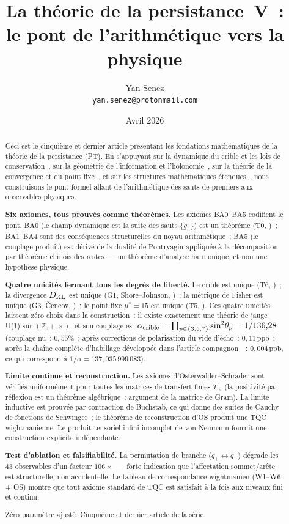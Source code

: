 \documentclass[12pt,a4paper]{article}
\title{\textbf{La théorie de la persistance~V~:\\
le pont de l'arithmétique vers la physique}}
\author{Yan Senez\\\texttt{yan.senez@protonmail.com}}
\date{Avril 2026}
\begin{document}
\maketitle

\begin{abstract}
Ceci est le cinquième et dernier article présentant les fondations
mathématiques de la théorie de la persistance (PT). En s'appuyant
sur la dynamique du crible et les lois de
conservation~\cite{companion_M1}, sur la géométrie de l'information
et l'holonomie~\cite{companion_M2}, sur la théorie de la convergence
et du point fixe~\cite{companion_M3}, et sur les structures
mathématiques étendues~\cite{companion_M4}, nous construisons le pont
formel allant de l'arithmétique des sauts de premiers aux observables
physiques.

\textbf{Six axiomes, tous prouvés comme théorèmes.}
Les axiomes BA0--BA5 codifient le pont. BA0 (le champ dynamique est
la suite des sauts $\{g_n\}$) est un théorème (T0,
\cite{companion_M3})~; BA1--BA4 sont des conséquences structurelles
du noyau arithmétique~; BA5 (le couplage produit) est dérivé de la
dualité de Pontryagin appliquée à la décomposition par théorème
chinois des restes~--- un théorème d'analyse harmonique, et non une
hypothèse physique.

\textbf{Quatre unicités fermant tous les degrés de liberté.}
Le crible est unique (T6, \cite{companion_M2})~; la divergence
$D_{\rm KL}$ est unique (G1, Shore--Johnson, \cite{companion_M2})~;
la métrique de Fisher est unique (G3, \v{C}encov, \cite{companion_M2})~;
le point fixe $\mu^* = 15$ est unique (T5, \cite{companion_M3}). Ces
quatre unicités laissent zéro choix dans la construction~: il existe
exactement une théorie de jauge U(1) sur $(\mathbb{Z}, +, \times)$, et
son couplage est
$\alpha_{\rm crible} = \prod_{p \in \{3,5,7\}} \sin^2\!\theta_p = 1/136{,}28$
(couplage nu~: $0{,}55\%$~; après corrections de polarisation du vide
d'écho~: $0{,}11\,\mathrm{ppb}$~; après la chaîne complète d'habillage
développée dans l'article compagnon~\cite{companion_physics}~:
$0{,}004\,\mathrm{ppb}$, ce qui correspond à
$1/\alpha = 137{,}035\,999\,083$).

\textbf{Limite continue et reconstruction.}
Les axiomes d'Osterwalder--Schrader sont vérifiés uniformément pour
toutes les matrices de transfert finies $T_m$ (la positivité par
réflexion est un théorème algébrique~: argument de la matrice de
Gram). La limite inductive est prouvée par contraction de Buchstab,
ce qui donne des suites de Cauchy de fonctions de Schwinger~; le
théorème de reconstruction d'OS produit une TQC wightmanienne. Le
produit tensoriel infini incomplet de von Neumann fournit une
construction explicite indépendante.

\textbf{Test d'ablation et falsifiabilité.}
La permutation de branche ($q_{+} \leftrightarrow q_{-}$) dégrade les
43 observables d'un facteur $106\times$~--- forte indication que
l'affectation sommet/arête est structurelle, non accidentelle. Le
tableau de correspondance wightmanien (W1--W6 + OS) montre que tout
axiome standard de TQC est satisfait à la fois aux niveaux fini et
continu.

Zéro paramètre ajusté. Cinquième et dernier article de la série.
\end{abstract}
\end{document}
